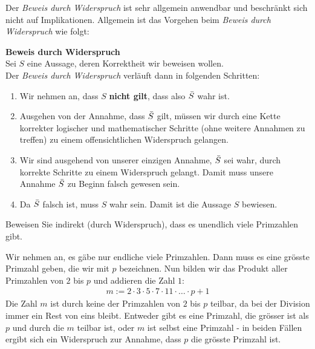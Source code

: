 Der \textit{Beweis durch Widerspruch} ist sehr allgemein anwendbar und beschränkt sich nicht auf Implikationen. Allgemein ist das Vorgehen beim \textit{Beweis durch Widerspruch} wie folgt:
\begin{mdframed}[backgroundcolor=green!20,nobreak=true]\label{vorgehen_widerspruch}
	\textbf{Beweis durch Widerspruch}\\
	Sei $S$ eine Aussage, deren Korrektheit wir beweisen wollen.\\
	Der \textit{Beweis durch Widerspruch} verläuft dann in folgenden Schritten:
	\begin{enumerate}
		\item Wir nehmen an, dass $S$ \textbf{nicht gilt}, dass also $\Bar{S}$ wahr ist.
		\item Ausgehen von der Annahme, dass $\Bar{S}$ gilt, müssen wir durch eine Kette korrekter logischer und mathematischer Schritte (ohne weitere Annahmen zu treffen) zu einem offensichtlichen Widerspruch gelangen.
		\item Wir sind ausgehend von unserer einzigen Annahme, $\Bar{S}$ sei wahr, durch korrekte Schritte zu einem Widerspruch gelangt. Damit muss unsere Annahme $\Bar{S}$ zu Beginn falsch gewesen sein.
		\item Da $\Bar{S}$ falsch ist, muss $S$ wahr sein. Damit ist die Aussage $S$ bewiesen.
	\end{enumerate}
\end{mdframed}
\clearpage

\begin{myexercise}%
	\noindent
	Beweisen Sie indirekt (durch Widerspruch), dass es unendlich viele Primzahlen gibt.
\end{myexercise}
\begin{myanswer}
	\noindent
	Wir nehmen an, es gäbe nur endliche viele Primzahlen. Dann muss es eine grösste Primzahl geben, die wir mit $p$ bezeichnen. Nun bilden wir das Produkt aller Primzahlen von $2$ bis $p$ und addieren die Zahl $1$:
	\begin{align*}
		m := 2\cdot 3\cdot 5\cdot 7\cdot 11\cdot \ldots  \cdot p + 1
	\end{align*}
	Die Zahl $m$ ist durch keine der Primzahlen von $2$ bis $p$ teilbar, da bei der Division immer ein Rest von eins bleibt. Entweder gibt es eine Primzahl, die grösser ist als $p$ und durch die $m$ teilbar ist, oder $m$ ist selbst eine Primzahl - in beiden Fällen ergibt sich ein Widerspruch zur Annahme, dass $p$ die grösste Primzahl ist.
\end{myanswer}

